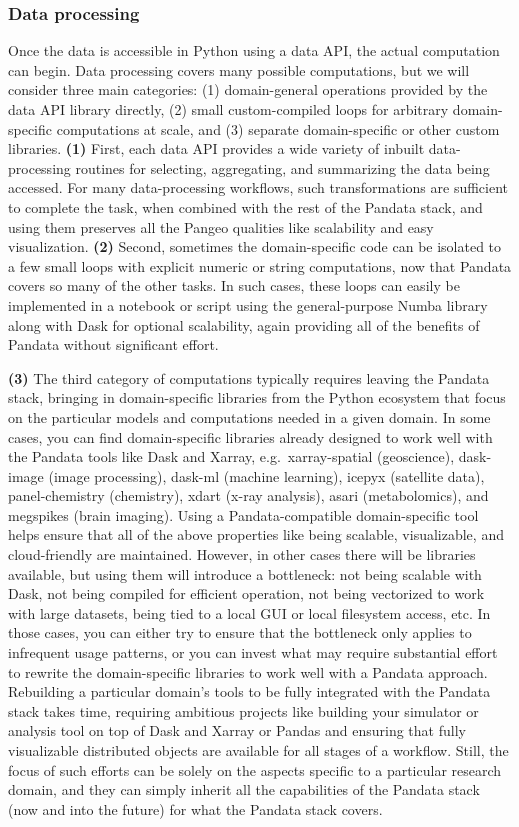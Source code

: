 \subsubsection{Data processing}

Once the data is accessible in Python using a data API, the actual computation can begin. Data processing covers many possible computations, but we will consider three main categories: (1) domain-general operations provided by the data API library directly, (2) small custom-compiled loops for arbitrary domain-specific computations at scale, and (3) separate domain-specific or other custom libraries.
\textbf{(1)} First, each data API provides a wide variety of inbuilt data-processing routines for selecting, aggregating, and summarizing the data being accessed. For many data-processing workflows, such transformations are sufficient to complete the task, when combined with the rest of the Pandata stack, and using them preserves all the Pangeo qualities like scalability and easy visualization.
\textbf{(2)} Second, sometimes the domain-specific code can be isolated to a few small loops with explicit numeric or string computations, now that Pandata covers so many of the other tasks. In such cases, these loops can easily be implemented in a notebook or script using the general-purpose Numba library along with Dask for optional scalability, again providing all of the benefits of Pandata without significant effort.

\textbf{(3)} The third category of computations typically requires leaving the Pandata stack, bringing in domain-specific libraries from the Python ecosystem that focus on the particular models and computations needed in a given domain. In some cases, you can find domain-specific libraries already designed to work well with the Pandata tools like Dask and Xarray, e.g.\ xarray-spatial (geoscience), dask-image (image processing), dask-ml (machine learning), icepyx (satellite data), panel-chemistry (chemistry), xdart (x-ray analysis), asari (metabolomics), and megspikes (brain imaging). Using a Pandata-compatible domain-specific tool helps ensure that all of the above properties like being scalable, visualizable, and cloud-friendly are maintained. However, in other cases there will be libraries available, but using them will introduce a bottleneck: not being scalable with Dask, not being compiled for efficient operation, not being vectorized to work with large datasets, being tied to a local GUI or local filesystem access, etc. In those cases, you can either try to ensure that the bottleneck only applies to infrequent usage patterns, or you can invest what may require substantial effort to rewrite the domain-specific libraries to work well with a Pandata approach. Rebuilding a particular domain's tools to be fully integrated with the Pandata stack takes time, requiring ambitious projects like building your simulator or analysis tool on top of Dask and Xarray or Pandas and ensuring that fully visualizable distributed objects are available for all stages of a workflow. Still, the focus of such efforts can be solely on the aspects specific to a particular research domain, and they can simply inherit all the capabilities of the Pandata stack (now and into the future) for what the Pandata stack covers.


